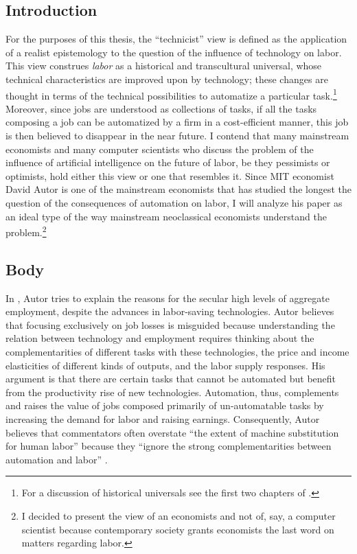 \documentclass[version=last,draft=false,paper=A4,portrait,twoside=true,twocolumn=false,headinclude=false,footinclude=false,mpinclude=true,fontsize=12,BCOR=20mm,DIV=calc,pagesize=auto,open=right,chapterprefix=true,numbers=autoendperiod,headsepline=false,headings=twolinechapter,parskip=false]{scrbook}
\begin{document}
\subsection{Introduction}
\label{sec:orgebb903a}
For the purposes of this thesis, the ``technicist'' view is defined as the
application of a realist epistemology to the question of the influence of
technology on labor. This view construes \emph{labor} as a historical and
transcultural universal, whose technical characteristics are improved upon
by technology; these changes are thought in terms of the technical
possibilities to automatize a particular task.\footnote{For a discussion of historical universals see the first two chapters
of \textcite{foucault2004}.} Moreover, since jobs
are understood as collections of tasks, if all the tasks composing a job
can be automatized by a firm in a cost-efficient manner, this job is then
believed to disappear in the near future. I contend that many mainstream
economists and many computer scientists who discuss the problem of the
influence of artificial intelligence on the future of labor, be they
pessimists or optimists, hold either this view or one that resembles it.
Since MIT economist David Autor is one of the mainstream economists that
has studied the longest the question of the consequences of automation on
labor, I will analyze his paper  as an ideal type of the
way mainstream neoclassical economists understand the problem.\footnote{I decided to present the view of an economists and not of, say, a
computer scientist because contemporary society grants economists the last
word on matters regarding labor.}

\subsection{Body}
\label{sec:org735bfdf}

In , Autor tries to explain the reasons for the secular
high levels of aggregate employment, despite the advances in labor-saving
technologies. Autor believes that focusing exclusively on job losses is
misguided because understanding the relation between technology and
employment requires thinking about the complementarities of different tasks
with these technologies, the price and income elasticities of different
kinds of outputs, and the labor supply responses. His argument is that
there are certain tasks that cannot be automated but benefit from the
productivity rise of new technologies. Automation, thus, complements and
raises the value of jobs composed primarily of un-automatable tasks by
increasing the demand for labor and raising earnings. Consequently, Autor
believes that commentators often overstate ``the extent of machine
substitution for human labor'' because they ``ignore the strong
complementarities between automation and labor'' \autocite[p.
5]{autor2015}.
\end{document}
